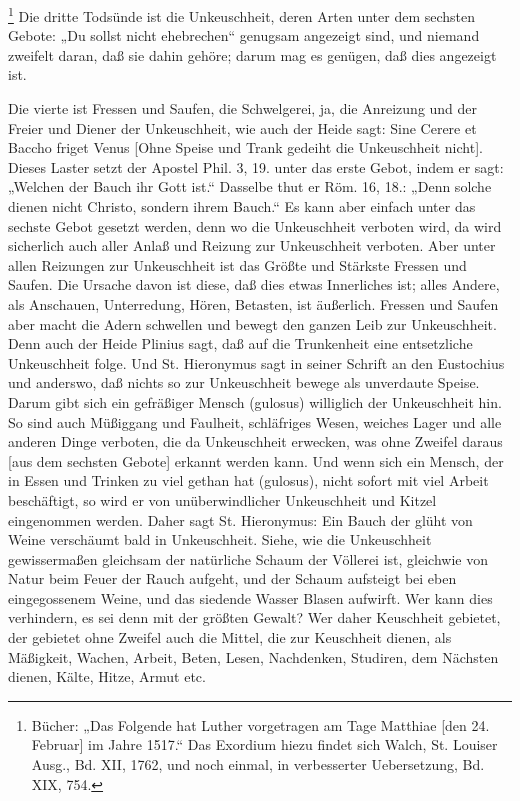 \footnote{Bücher: „Das Folgende hat Luther vorgetragen am Tage Matthiae [den 24. Februar] im Jahre 1517.“ Das Exordium hiezu findet sich Walch, St. Louiser Ausg., Bd. XII, 1762, und noch einmal, in verbesserter Uebersetzung, Bd. XIX, 754.} Die dritte Todsünde ist die Unkeuschheit, deren Arten unter dem sechsten Gebote: „Du sollst nicht ehebrechen“ genugsam angezeigt sind, und niemand zweifelt daran, daß sie dahin gehöre; darum mag es genügen, daß dies angezeigt ist.

Die vierte ist Fressen und Saufen, die Schwelgerei, ja, die Anreizung und der Freier und Diener der Unkeuschheit, wie auch der Heide sagt: Sine Cerere et Baccho friget Venus [Ohne Speise und Trank gedeiht die Unkeuschheit nicht]. Dieses Laster setzt der Apostel Phil. 3, 19. unter das erste Gebot, indem er sagt: „Welchen der Bauch ihr Gott ist.“ Dasselbe thut er Röm. 16, 18.: „Denn solche dienen nicht Christo, sondern ihrem Bauch.“ Es kann aber einfach unter das sechste Gebot gesetzt werden, denn wo die Unkeuschheit verboten wird, da wird sicherlich auch aller Anlaß und Reizung zur Unkeuschheit verboten. Aber unter allen Reizungen zur Unkeuschheit ist das Größte und Stärkste Fressen und Saufen. Die Ursache davon ist diese, daß dies etwas Innerliches ist; alles Andere, als Anschauen, Unterredung, Hören, Betasten, ist äußerlich. Fressen und Saufen aber macht die Adern schwellen und bewegt den ganzen Leib zur Unkeuschheit. Denn auch der Heide Plinius sagt, daß auf die Trunkenheit eine entsetzliche Unkeuschheit folge. Und St. Hieronymus sagt
in seiner Schrift an den Eustochius und anderswo, daß nichts so zur Unkeuschheit bewege als unverdaute Speise. Darum gibt sich ein gefräßiger Mensch (gulosus) williglich der Unkeuschheit hin. So sind auch Müßiggang und Faulheit, schläfriges Wesen, weiches Lager und alle anderen Dinge verboten, die da Unkeuschheit erwecken, was ohne Zweifel daraus [aus dem sechsten Gebote] erkannt werden kann. Und wenn sich ein Mensch, der in Essen und Trinken zu viel gethan hat (gulosus), nicht sofort mit viel Arbeit beschäftigt, so wird er von unüberwindlicher Unkeuschheit und Kitzel eingenommen werden. Daher sagt St. Hieronymus: Ein Bauch der glüht von Weine verschäumt bald in Unkeuschheit. Siehe, wie die Unkeuschheit gewissermaßen gleichsam der natürliche Schaum der Völlerei ist, gleichwie von Natur beim Feuer der Rauch aufgeht, und der Schaum aufsteigt bei eben eingegossenem Weine, und das siedende Wasser Blasen aufwirft. Wer kann dies verhindern, es sei denn mit der größten Gewalt? Wer daher Keuschheit gebietet, der gebietet ohne Zweifel auch die Mittel, die zur Keuschheit dienen, als Mäßigkeit, Wachen, Arbeit, Beten, Lesen, Nachdenken, Studiren, dem Nächsten dienen, Kälte, Hitze, Armut etc.

